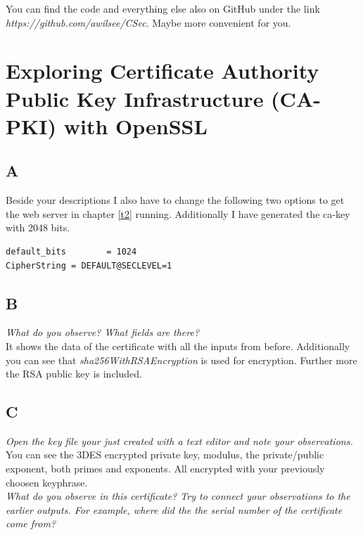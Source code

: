 You can find the code and everything else also on GitHub under the link \textit{https://github.com/awilsee/CSec}. Maybe more convenient for you.


\section{Exploring Certificate Authority Public Key Infrastructure (CA-PKI) with OpenSSL}

\subsection{A}

Beside your descriptions I also have to change the following two options to get the web server in chapter \ref{t2} running. Additionally I have generated the ca-key with 2048 bits.

\begin{lstlisting}
default_bits		= 1024
CipherString = DEFAULT@SECLEVEL=1
\end{lstlisting}

\subsection{B}

\textit{What do you observe? What fields are there?} \\

It shows the data of the certificate with all the inputs from before. Additionally you can see that \textit{sha256WithRSAEncryption} is used for encryption. Further more the RSA public key is included.\\

\subsection{C}

\textit{Open the key file your just created with a text editor and note your observations.} \\

You can see the 3DES encrypted private key, modulus, the private/public exponent, both primes and exponents. All encrypted with your previously choosen keyphrase.\\

\textit{What do you observe in this certificate? Try to connect your
observations to the earlier outputs. For example, where did the the serial number of the certificate come from?}\\


